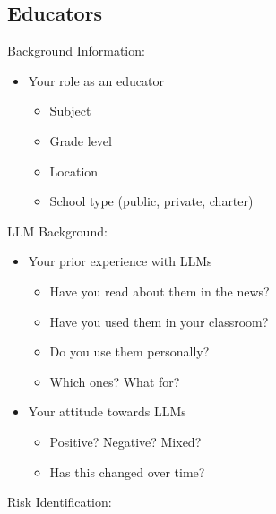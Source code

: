 \subsection{Educators}
Background Information: 
\begin{itemize}
    \item Your role as an educator
    \begin{itemize}
        \item Subject
        \item Grade level
        \item Location
        \item School type (public, private, charter)
    \end{itemize}
\end{itemize}
LLM Background: 
\begin{itemize}
    \item Your prior experience with LLMs
    \begin{itemize}
        \item Have you read about them in the news?
        \item Have you used them in your classroom?
        \item Do you use them personally?
        \item Which ones? What for? 
    \end{itemize} 
    \item Your attitude towards LLMs 
    \begin{itemize}
        \item Positive? Negative? Mixed?
        \item Has this changed over time?
    \end{itemize}  
\end{itemize}
Risk Identification:
